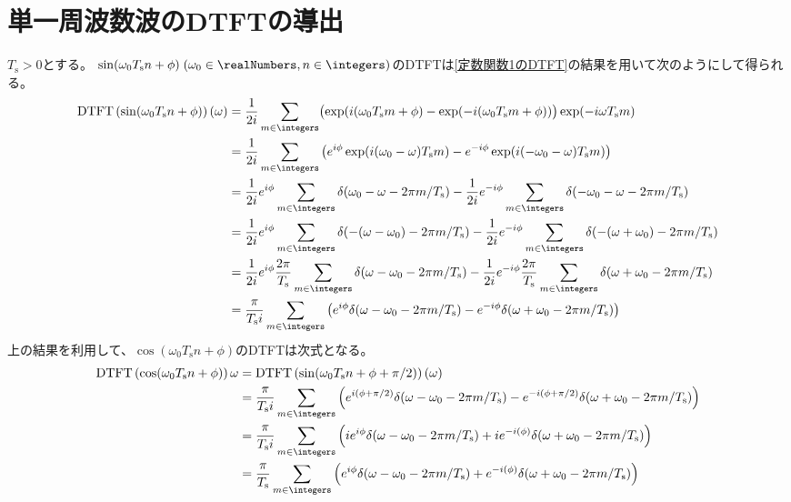     \section{単一周波数波のDTFTの導出}
        \newcommand{\Ts}{T_\mathrm{s}}
        $\Ts>0$とする。
        $\sin(\omega_0 \Ts n + \phi)\;(\omega_0\in\realNumbers, n\in\integers)$のDTFTは\ref{定数関数1のDTFT}の結果を用いて次のようにして得られる。
        \begin{align*}
            \DTFTwithArg{\sin(\omega_0 \Ts n + \phi)}{\omega} &= \frac{1}{2i}\sum_{m\in\integers} \bigl(\exp(i(\omega_0\Ts m + \phi) - \exp(-i(\omega_0\Ts m + \phi))\bigr)\exp(-i\omega\Ts m) \\
            &= \frac{1}{2i}\sum_{m\in\integers} \left(e^{i\phi}\exp(i(\omega_0-\omega)\Ts m) - e^{-i\phi}\exp(i(-\omega_0-\omega)\Ts m)\right) \\
            &= \frac{1}{2i}e^{i\phi}\sum_{m\in\integers}\delta(\omega_0-\omega - 2\pi m/\Ts) - \frac{1}{2i}e^{-i\phi}\sum_{m\in\integers}\delta(-\omega_0-\omega - 2\pi m/\Ts) \\
            &= \frac{1}{2i}e^{i\phi}\sum_{m\in\integers}\delta(-(\omega-\omega_0) - 2\pi m/\Ts) - \frac{1}{2i}e^{-i\phi}\sum_{m\in\integers}\delta(-(\omega+\omega_0) - 2\pi m/\Ts) \\
            &= \frac{1}{2i}e^{i\phi}\frac{2\pi}{\Ts}\sum_{m\in\integers}\delta(\omega-\omega_0 - 2\pi m/\Ts) - \frac{1}{2i}e^{-i\phi}\frac{2\pi}{\Ts}\sum_{m\in\integers}\delta(\omega+\omega_0 - 2\pi m/\Ts) \\
            &= \frac{\pi}{\Ts i}\sum_{m\in\integers}\left(e^{i\phi}\delta(\omega-\omega_0 - 2\pi m/\Ts) - e^{-i\phi}\delta(\omega+\omega_0 - 2\pi m/\Ts)\right)
        \end{align*}
        上の結果を利用して、$\cos(\omega_0 \Ts n + \phi)$のDTFTは次式となる。
        \begin{align*}
            \DTFT{\cos(\omega_0 \Ts n + \phi)}{\omega} &= \DTFTwithArg{\sin(\omega_0 T_\text{s} n + \phi + \pi/2)}{\omega} \\
            &= \frac{\pi}{\Ts i}\sum_{m\in\integers}\left(e^{i(\phi+\pi/2)}\delta(\omega-\omega_0 - 2\pi m/\Ts) - e^{-i(\phi+\pi/2)}\delta(\omega+\omega_0 - 2\pi m/\Ts)\right) \\
            &= \frac{\pi}{\Ts i}\sum_{m\in\integers}\left(ie^{i\phi}\delta(\omega-\omega_0 - 2\pi m/\Ts) + ie^{-i(\phi)}\delta(\omega+\omega_0 - 2\pi m/\Ts)\right) \\
            &= \frac{\pi}{\Ts}\sum_{m\in\integers}\left(e^{i\phi}\delta(\omega-\omega_0 - 2\pi m/\Ts) + e^{-i(\phi)}\delta(\omega+\omega_0 - 2\pi m/\Ts)\right)
        \end{align*}
